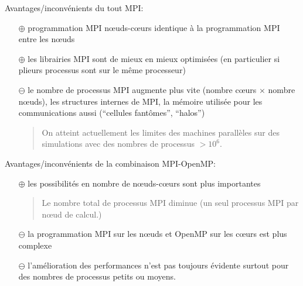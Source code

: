 \documentclass{beamer}
\begin{document}
\begin{frame}
	
\vfill

Avantages/inconvénients du tout MPI:
	
\vfill
\begin{itemize}
	\item[\LARGE $\mathbf\oplus$] programmation MPI n\oe uds-c\oe urs identique à la programmation MPI entre les n\oe uds
	\vfill
	
	\item[\LARGE $\mathbf\oplus$] les librairies MPI sont de mieux en mieux optimisées (en particulier si plieurs processus sont sur le même processeur)
	
\vfill
	\item[\LARGE $\mathbf\ominus$] le nombre de processus MPI augmente plus vite (nombre c\oe urs $\times$ nombre n\oe uds), les structures internes de MPI, la mémoire utilisée pour les communications aussi (``cellules fant\^omes'', ``halos'')
	\bigskip
	
\bigskip

	\begin{quote}
On atteint actuellement les limites des machines parallèles sur des simulations avec des nombres de processus $> 10^6$.
	\end{quote}
	
\end{itemize}
\vfill
\end{frame}

\begin{frame}


\vfill
	Avantages/inconvénients de la combinaison MPI-OpenMP:
	
\vfill
	\begin{itemize}
		\item[\LARGE $\mathbf\oplus$] les possibilités en nombre de n\oe uds-c\oe urs sont plus importantes
		
\begin{quotation}\noindent%
Le nombre total de processus MPI diminue (un seul processus MPI par n\oe ud de calcul.)
\end{quotation}
	
\vfill
		\item[\LARGE $\mathbf\ominus$] la programmation MPI sur les n\oe uds et OpenMP sur les c\oe urs est plus complexe
	
\vfill
		\item[\LARGE $\mathbf\ominus$] l'amélioration des performances n'est pas toujours évidente surtout pour des nombres de processus petits ou moyens.
	\end{itemize}
	
	\vfill
\end{frame}
\end{document}
